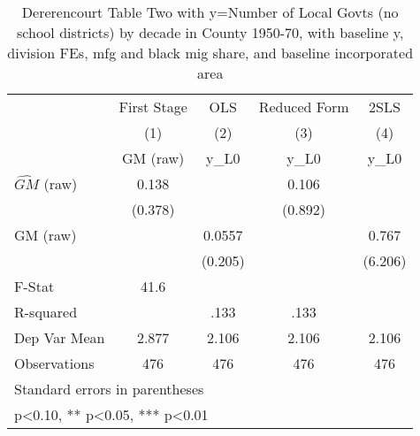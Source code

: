 \begin{table}[htbp]\centering
\def\sym#1{\ifmmode^{#1}\else\(^{#1}\)\fi}
\caption{Dererencourt Table Two with y=Number of Local Govts (no school districts) by decade in County 1950-70, with baseline y, division FEs, mfg and black mig share, and baseline incorporated area}
\begin{tabular}{l*{4}{c}}
\toprule
                    & First Stage   &         OLS   &Reduced Form   &        2SLS   \\
                    &\multicolumn{1}{c}{(1)}&\multicolumn{1}{c}{(2)}&\multicolumn{1}{c}{(3)}&\multicolumn{1}{c}{(4)}\\
                    &\multicolumn{1}{c}{GM  (raw)}&\multicolumn{1}{c}{y\_L0}&\multicolumn{1}{c}{y\_L0}&\multicolumn{1}{c}{y\_L0}\\
\midrule
$\hat{GM}$ (raw)    &       0.138   &               &       0.106   &               \\
                    &     (0.378)   &               &     (0.892)   &               \\
\addlinespace
GM  (raw)           &               &      0.0557   &               &       0.767   \\
                    &               &     (0.205)   &               &     (6.206)   \\
\midrule
F-Stat              &        41.6   &               &               &               \\
R-squared           &               &        .133   &        .133   &               \\
Dep Var Mean        &       2.877   &       2.106   &       2.106   &       2.106   \\
Observations        &         476   &         476   &         476   &         476   \\
\bottomrule
\multicolumn{5}{l}{\footnotesize Standard errors in parentheses}\\
\multicolumn{5}{l}{\footnotesize * p<0.10, ** p<0.05, *** p<0.01}\\
\end{tabular}
\end{table}
